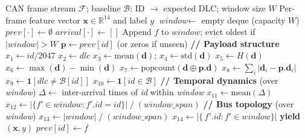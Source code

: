 \begin{algorithm}[H]
\caption{CAN Sliding-Window Feature Extraction}
\label{alg:features}
\begin{algorithmic}[1]
\Require CAN frame stream $\mathcal{F}$; baseline $\mathcal{B}$: ID $\to$ expected DLC; window size $W$
\Ensure Per-frame feature vector $\mathbf{x} \in \mathbb{R}^{14}$ and label $y$
\State $\textit{window} \leftarrow$ empty deque (capacity $W$)
\State $\textit{prev}[\cdot] \leftarrow \emptyset$ 
\State $\textit{arrival}[\cdot] \leftarrow []$ 
    \State Append $f$ to $\textit{window}$; evict oldest if $|\textit{window}| > W$
    \State $\mathbf{p} \leftarrow \textit{prev}[\textit{id}]$ (or zeros if unseen)
    \State \textbf{// Payload structure}
    \State $x_1 \leftarrow \textit{id} / 2047$ 
    \State $x_2 \leftarrow \textit{dlc}$
    \State $x_3 \leftarrow \mathrm{mean}(\mathbf{d})$;\; $x_4 \leftarrow \mathrm{std}(\mathbf{d})$
    \State $x_5 \leftarrow H(\mathbf{d})$ 
    \State $x_6 \leftarrow \max(\mathbf{d}) - \min(\mathbf{d})$
    \State $x_7 \leftarrow \mathrm{popcount}(\mathbf{d} \oplus \mathbf{p}.\mathbf{d})$ 
    \State $x_8 \leftarrow \sum_i |\mathbf{d}_i - \mathbf{p}.\mathbf{d}_i|$ 
    \State $x_9 \leftarrow \mathbf{1}[\textit{dlc} \neq \mathcal{B}[\textit{id}]]$ 
    \State $x_{10} \leftarrow \mathbf{1}[\textit{id} \in \mathcal{B}]$ 
    \State \textbf{// Temporal dynamics} (over \textit{window})
    \State $\Delta \leftarrow$ inter-arrival times of \textit{id} within \textit{window}
    \State $x_{11} \leftarrow \mathrm{mean}(\Delta)$
    \State $x_{12} \leftarrow |\{f' \in \textit{window} : f'.\textit{id} = \textit{id}\}| \;/\; (\textit{window\_span})$
    \State \textbf{// Bus topology} (over \textit{window})
    \State $x_{13} \leftarrow |\textit{window}| \;/\; (\textit{window\_span})$ 
    \State $x_{14} \leftarrow |\{\,f'.\textit{id} : f' \in \textit{window}\}|$ 
    \State \textbf{yield} $(\mathbf{x}, y)$
    \State $\textit{prev}[\textit{id}] \leftarrow f$
\EndFor
\end{algorithmic}
\end{algorithm}


